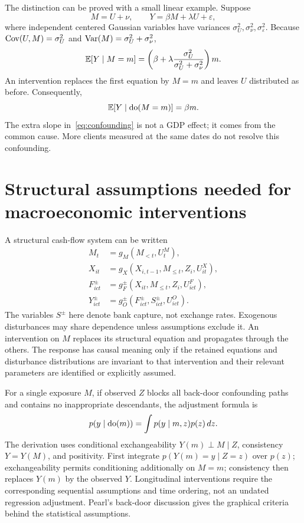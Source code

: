 The distinction can be proved with a small linear example. Suppose
\begin{equation}
M=U+\nu,\qquad Y=\beta M+\lambda U+\varepsilon,
\end{equation}
where independent centered Gaussian variables have variances $\sigma_U^2,\sigma_\nu^2,\sigma_\varepsilon^2$. Because
$\operatorname{Cov}(U,M)=\sigma_U^2$ and $\operatorname{Var}(M)=\sigma_U^2+\sigma_\nu^2$,
\begin{equation}
\mathbb E[Y\mid M=m]=
\left(\beta+\lambda\frac{\sigma_U^2}{\sigma_U^2+\sigma_\nu^2}\right)m.
\label{eq:confounding}
\end{equation}
An intervention replaces the first equation by $M=m$ and leaves $U$ distributed as before. Consequently,
\begin{equation}
\mathbb E[Y\mid\operatorname{do}(M=m)]=\beta m.
\end{equation}
The extra slope in~\eqref{eq:confounding} is not a GDP effect; it comes from the common cause. More clients measured at the same dates do not resolve this confounding.

\section{Structural assumptions needed for macroeconomic interventions}
A structural cash-flow system can be written
\begin{align}
M_t&=g_M(M_{<t},U^M_t),\\
X_{it}&=g_X(X_{i,t-1},M_{\leq t},Z_i,U^X_{it}),\\
F^\pm_{ict}&=g^\pm_F(X_{it},M_{\leq t},Z_i,U^F_{ict}),\\
Y^\pm_{ict}&=g^\pm_O(F^\pm_{ict},S^\pm_{ict},U^O_{ict}).
\end{align}
The variables $S^\pm$ here denote bank capture, not exchange rates. Exogenous disturbances may share dependence unless assumptions exclude it. An intervention on $M$ replaces its structural equation and propagates through the others. The response has causal meaning only if the retained equations and disturbance distributions are invariant to that intervention and their relevant parameters are identified or explicitly assumed.

For a single exposure $M$, if observed $Z$ blocks all back-door confounding paths and contains no inappropriate descendants, the adjustment formula is
\begin{equation}
p(y\mid\operatorname{do}(m))=\int p(y\mid m,z)p(z)\,dz.
\label{eq:backdoor}
\end{equation}
The derivation uses conditional exchangeability $Y(m)\perp M\mid Z$, consistency $Y=Y(M)$, and positivity. First integrate $p(Y(m)=y\mid Z=z)$ over $p(z)$; exchangeability permits conditioning additionally on $M=m$; consistency then replaces $Y(m)$ by the observed $Y$. Longitudinal interventions require the corresponding sequential assumptions and time ordering, not an undated regression adjustment. Pearl's back-door discussion gives the graphical criteria behind the statistical assumptions.

